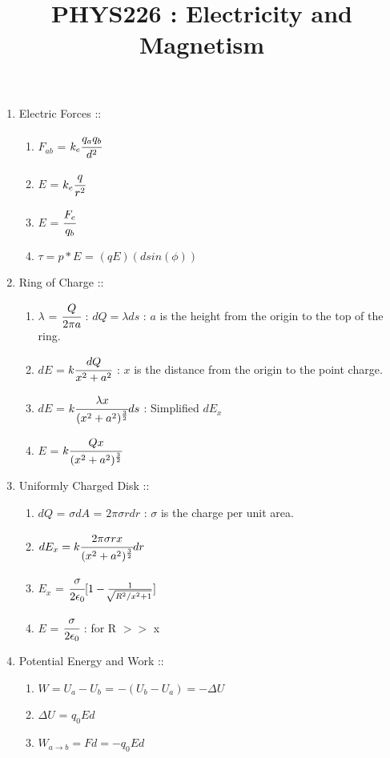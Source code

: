 \documentclass[12pt]{article}
\begin{document}
\title{PHYS226 : Electricity and Magnetism}
\maketitle


\begin{enumerate}
	\item[] Electric Forces ::
	\begin{enumerate}
		\item[] $F_{ab}$ = $k_e\cfrac{q_aq_b}{d^2}$
		\item[] $E$ = $k_e\cfrac{q}{r^2}$
		\item[] $E$ = $\cfrac{F_e}{q_b}$
		\item[] $\tau = p * E$ = $(qE)(dsin(\phi))$\\
	\end{enumerate}
	\item[] Ring of Charge ::
	\begin{enumerate}
		\item[] $\lambda$ = $\cfrac{Q}{2\pi a}$ : $dQ = \lambda ds$ : $a$ is the height from the origin to the top of the ring.
		\item[] $dE$ = $k \cfrac{dQ}{x^2 + a^2}$ : $x$ is the distance from the origin to the point charge.
		\item[] $dE$ = $k \cfrac{\lambda x}{(x^2 + a^2)^{\frac{3}{2}}}ds$ : Simplified $dE_x$
		\item[] $E$ = $k\cfrac{Qx}{(x^2 + a^2)^{\frac{3}{2}}}$ \\
	\end{enumerate}
	\item[] Uniformly Charged Disk ::
	\begin{enumerate}
		\item[] $dQ$ = $\sigma dA$ = $2\pi \sigma rdr$ : $\sigma$ is the charge per unit area.
		\item[] $dE_x = k\cfrac{2\pi \sigma rx}{(x^2 + a^2)^{\frac{3}{2}}}dr$
		\item[] $E_x$ = $\cfrac{\sigma}{2\epsilon_0}[1 - \frac{1}{\sqrt[]{R^2/x^2 + 1}}]$
		\item[] $E$ = $\cfrac{\sigma}{2\epsilon_0}$ : for R $>>$ x
	\end{enumerate}
	\pagebreak
	\item[] Potential Energy and Work :: 
	\begin{enumerate}
		\item[] $W = U_a - U_b$ = $-(U_b - U_a) = -\Delta U$
		\item[] $\Delta U$ = $q_0Ed$
		\item[] $W_{a \rightarrow b} = Fd = -q_0Ed$

\end{enumerate}
\end{enumerate}
\end{document}
